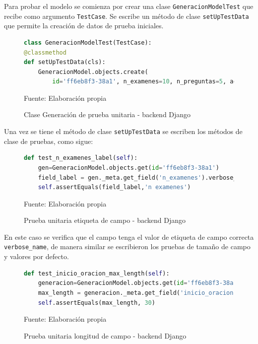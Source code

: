 \documentclass[../Main.tex]{subfiles}
\begin{document}
    Para probar el modelo se comienza por crear una clase \texttt{GeneracionModelTest} que recibe como argumento \texttt{TestCase}. Se escribe un método de clase \texttt{setUpTestData} que permite la creación de datos de prueba iniciales.
    
    \begin{figure}[H]
	\begin{Center}
    \begin{lstlisting}[language=Python]
class GeneracionModelTest(TestCase):
@classmethod
def setUpTestData(cls):
    GeneracionModel.objects.create(
        id='ff6eb8f3-38a1', n_examenes=10, n_preguntas=5, account)\end{lstlisting}
    \caption{Clase Generación de prueba unitaria - backend Django}
	    Fuente: Elaboración propia
        \label{fig:section}
	\end{Center}
    \end{figure}
    
    Una vez se tiene el método de clase \texttt{setUpTestData} se escriben los métodos de clase de pruebas, como sigue:
    
    \begin{figure}[H]
	\begin{Center}
    \begin{lstlisting}[language=Python]
def test_n_examenes_label(self):
    gen=GeneracionModel.objects.get(id='ff6eb8f3-38a1')
    field_label = gen._meta.get_field('n_examenes').verbose_name
    self.assertEquals(field_label,'n examenes')\end{lstlisting}
        \caption{{Prueba unitaria etiqueta de campo - backend Django}}
	    Fuente: Elaboración propia
        \label{fig:section}
	\end{Center}
    \end{figure}
    
    En este caso se verifica que el campo tenga el valor de etiqueta de campo correcta \texttt{verbose\_name}, de manera similar se escribieron los pruebas de tamaño de campo y valores por defecto.
    
    \begin{figure}[H]
	\begin{Center}
    \begin{lstlisting}[language=Python]
def test_inicio_oracion_max_length(self):
    generacion=GeneracionModel.objects.get(id='ff6eb8f3-38a1')
    max_length = generacion._meta.get_field('inicio_oracion').max_length
    self.assertEquals(max_length, 30)\end{lstlisting}
        \caption{Prueba unitaria longitud de campo - backend Django}
	    Fuente: Elaboración propia
        \label{fig:section}
	\end{Center}
    \end{figure}
    
\end{document}
